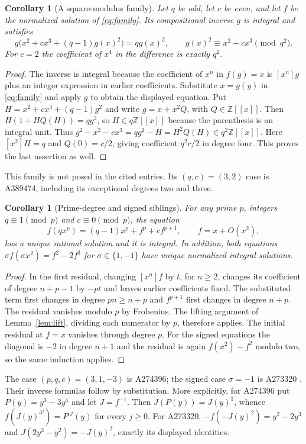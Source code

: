 \documentclass[11pt]{article}
\newtheorem{corollary}[theorem]{Corollary}
\newcommand{\Z}{\mathbb Z}
\begin{document}
\begin{corollary}[A square-modulus family]\label{cor:parameter}
Let $q$ be odd, let $c$ be even, and let $f$ be the normalized solution
of \eqref{eq:family}. Its compositional inverse $g$ is integral and satisfies
\[
 g\bigl(x^2+cx^3+(q-1)g(x)^2\bigr)=qg(x)^2,
 \qquad g(x)^2\equiv x^2+cx^3\pmod{q^2}.
\]
For $c=2$ the coefficient of $x^4$ in the difference is exactly $q^2$.
\end{corollary}
\begin{proof}
The inverse is integral because the coefficient of $x^n$ in $f(g)=x$
is $[x^n]g$ plus an integer expression in earlier coefficients.
Substitute $x=g(y)$ in \eqref{eq:family} and apply $g$ to obtain the
displayed equation. Put $H=x^2+cx^3+(q-1)g^2$ and write
$g=x+x^2Q$, with $Q\in\Z[[x]]$. Then
$H(1+HQ(H))=qg^2$, so $H\in q\Z[[x]]$ because the parenthesis
is an integral unit. Thus
$g^2-x^2-cx^3=qg^2-H=H^2Q(H)\in q^2\Z[[x]]$.
Here $[x^2]H=q$ and $Q(0)=c/2$, giving coefficient $q^2c/2$
in degree four. This proves the last assertion as well.
\end{proof}

This family is not posed in the cited entries. Its $(q,c)=(3,2)$
case is A389474, including its exceptional degrees two and three.

\begin{corollary}[Prime-degree and signed siblings]\label{cor:prime}
For any prime $p$, integers $q\equiv1\pmod p$ and $c\equiv0\pmod p$,
the equation
\[
 f(qx^p)=(q-1)x^p+f^p+cf^{p+1},\qquad f=x+O(x^2),
\]
has a unique rational solution and it is integral.
In addition, both equations
$\sigma f(\sigma x^2)=f^2-2f^3$ for $\sigma\in\{1,-1\}$
have unique normalized integral solutions.
\end{corollary}
\begin{proof}
In the first residual, changing $[x^n]f$ by $t$, for $n\geq2$,
changes its coefficient of degree $n+p-1$ by $-pt$ and leaves
earlier coefficients fixed. The substituted term first changes in degree
$pn\geq n+p$ and $f^{p+1}$ first changes in degree $n+p$.
The residual vanishes modulo $p$ by Frobenius. The lifting argument
of Lemma~\ref{lem:lift}, dividing each numerator by $p$, therefore applies.
The initial residual at $f=x$ vanishes through degree $p$.
For the signed equations the diagonal is $-2$ in degree $n+1$ and the
residual is again $f(x^2)-f^2$ modulo two, so the same induction applies.
\end{proof}

The case $(p,q,c)=(3,1,-3)$ is A274396; the signed case $\sigma=-1$
is A273320 \cite{primeentries}. Their inverse formulas follow by
substitution. More explicitly, for A274396 put $P(y)=y^3-3y^4$
and let $J=f^{-1}$. Then $J(P(y))=J(y)^3$, whence
$f(J(y)^{3^j})=P^{\circ j}(y)$ for every $j\geq0$.
For A273320, $-f(-J(y)^2)=y^2-2y^3$ and
$J(2y^3-y^2)=-J(y)^2$, exactly its displayed identities.
\end{document}
